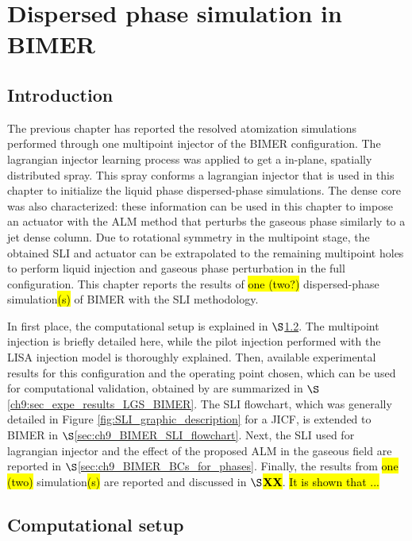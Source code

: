 \chapter{Dispersed phase simulation in BIMER}
	\label{ch9:BIMER_lagrangian}

\section{Introduction}

The previous chapter has reported the resolved atomization simulations performed through one multipoint injector of the BIMER configuration. The lagrangian injector learning process was applied to get a in-plane, spatially distributed spray. This spray conforms a lagrangian injector that is used in this chapter to initialize the liquid phase dispersed-phase simulations. The dense core was also characterized: these information can be used in this chapter to impose an actuator with the ALM method that perturbs the gaseous phase similarly to a jet dense column. Due to rotational symmetry in the multipoint stage, the obtained SLI and actuator can be extrapolated to the remaining multipoint holes to perform liquid injection and gaseous phase perturbation in the full configuration. This chapter reports the results of \hl{one (two?)} dispersed-phase simulation\hl{(s)} of BIMER with the SLI methodology.

In first place, the computational setup is explained in $\S$\ref{ch9:sec_computations_setup}. The multipoint injection is briefly detailed here, while the pilot injection performed with the LISA injection model is thoroughly explained. Then, available experimental results for this configuration and the operating point chosen, which can be used for computational validation, obtained by  are summarized in $\S$\ref{ch9:sec_expe_results_LGS_BIMER}. The SLI flowchart, which was generally detailed in Figure \ref{fig:SLI_graphic_description} for a JICF, is extended to BIMER in $\S$\ref{sec:ch9_BIMER_SLI_flowchart}. Next, the SLI used for lagrangian injector and the effect of the proposed ALM in the gaseous field are reported in $\S$\ref{sec:ch9_BIMER_BCs_for_phases}. Finally, the results from \hl{one (two)}  simulation\hl{(s)} are reported and discussed in $\S$\hl{\textbf{XX}}. \hl{It is shown that ...}





\section{Computational setup}
\label{ch9:sec_computations_setup}

